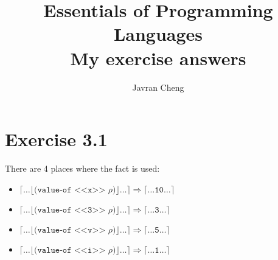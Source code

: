 \documentclass[11pt,a4paper]{article}
\title{Essentials of Programming Languages\\
{\large
My exercise answers}}
\author{Javran Cheng}
\begin{document}
\maketitle

\section{Exercise 3.1}

There are 4 places where the fact is used:

\begin{itemize}
    \item$  \lceil \dots \lfloor
                \texttt{(value-of <<x>> $\rho$)}
            \rfloor \dots \rceil
         \Rightarrow
            \lceil \dots
                \texttt{10}
            \dots \rceil$
    \item$  \lceil \dots \lfloor
                \texttt{(value-of <<3>> $\rho$)}
            \rfloor \dots \rceil
         \Rightarrow
            \lceil \dots
                \texttt{3}
            \dots \rceil$
    \item$  \lceil \dots \lfloor
                \texttt{(value-of <<v>> $\rho$)}
            \rfloor \dots \rceil
         \Rightarrow
            \lceil \dots
                \texttt{5}
            \dots \rceil$
    \item$  \lceil \dots \lfloor
                \texttt{(value-of <<i>> $\rho$)}
            \rfloor \dots \rceil
         \Rightarrow
            \lceil \dots
                \texttt{1}
            \dots \rceil$

\end{itemize}
\end{document}
